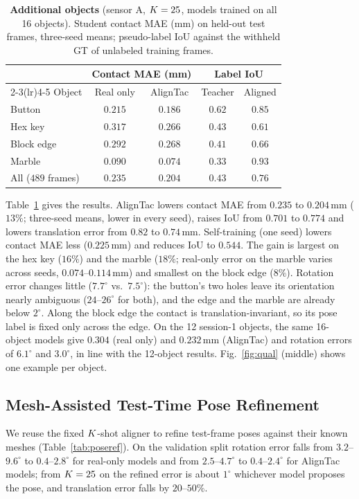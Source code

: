 \begin{table}[!tbp]
\centering
\tableformat
\begin{tabular}{lcccc}
\toprule
& \multicolumn{2}{c}{Contact MAE (mm)} & \multicolumn{2}{c}{Label IoU} \\
\cmidrule(lr){2-3}\cmidrule(lr){4-5}
Object & Real only & AlignTac & Teacher & Aligned \\
\midrule
Button & $0.215$ & $\mathbf{0.186}$ & $0.62$ & $\mathbf{0.85}$ \\
Hex key & $0.317$ & $\mathbf{0.266}$ & $0.43$ & $\mathbf{0.61}$ \\
Block edge & $0.292$ & $\mathbf{0.268}$ & $0.41$ & $\mathbf{0.66}$ \\
Marble & $0.090$ & $\mathbf{0.074}$ & $0.33$ & $\mathbf{0.93}$ \\
\midrule
All ($489$ frames) & $0.235$ & $\mathbf{0.204}$ & $0.43$ & $\mathbf{0.76}$ \\
\bottomrule
\end{tabular}
\caption{\textbf{Additional objects} (sensor A, $K=25$, models trained on all 16 objects). Student contact MAE (mm) on held-out test frames, three-seed means; pseudo-label IoU against the withheld GT of unlabeled training frames.}
\label{tab:addobj}
\end{table}

Table~\ref{tab:addobj} gives the results. AlignTac lowers contact MAE from $0.235$ to $0.204\,$mm ($13\%$; three-seed means, lower in every seed), raises IoU from $0.701$ to $0.774$ and lowers translation error from $0.82$ to $0.74\,$mm. Self-training (one seed) lowers contact MAE less ($0.225\,$mm) and reduces IoU to $0.544$. The gain is largest on the hex key ($16\%$) and the marble ($18\%$; real-only error on the marble varies across seeds, $0.074$--$0.114\,$mm) and smallest on the block edge ($8\%$). Rotation error changes little ($7.7^\circ$ vs.\ $7.5^\circ$): the button's two holes leave its orientation nearly ambiguous ($24$--$26^\circ$ for both), and the edge and the marble are already below $2^\circ$. Along the block edge the contact is translation-invariant, so its pose label is fixed only across the edge. On the 12 session-1 objects, the same 16-object models give $0.304$ (real only) and $0.232\,$mm (AlignTac) and rotation errors of $6.1^\circ$ and $3.0^\circ$, in line with the 12-object results. Fig.~\ref{fig:qual} (middle) shows one example per object.

\subsection{Mesh-Assisted Test-Time Pose Refinement}
\label{sec:tta}
We reuse the fixed $K$-shot aligner to refine test-frame poses against their known meshes (Table~\ref{tab:poseref}). On the validation split rotation error falls from $3.2$--$9.6^\circ$ to $0.4$--$2.8^\circ$ for real-only models and from $2.5$--$4.7^\circ$ to $0.4$--$2.4^\circ$ for AlignTac models; from $K=25$ on the refined error is about $1^\circ$ whichever model proposes the pose, and translation error falls by $20$--$50\%$.

